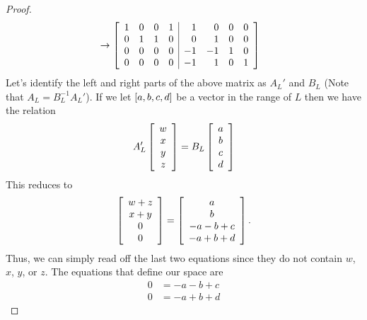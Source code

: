 \documentclass{tutorial}
\begin{document}
\begin{proof}
\begin{align*}
  & \rightarrow \left[ \begin{array}{rrrr|rrrr}
     1 &  0 &  0 &  1 & 1 & 0 & 0 & 0 \\
     0 &  1 &  1 &  0 & 0 & 1 & 0 & 0 \\
     0 &  0 &  0 &  0 &-1 &-1 & 1 & 0 \\
     0 &  0 &  0 &  0 &-1 & 1 & 0 & 1 \\
  \end{array} \right]
\end{align*}
Let's identify the left and right parts of the above matrix as $A_L'$ and $B_L$ (Note that $A_L = B_L^{-1}A_L'$). If we let $\left[ a, b, c, d \right]$ be a vector in the range of $L$ then we have the relation
\[
  A_L' \left[ \begin{array}{c} w \\ x \\ y \\ z \end{array} \right]
  = B_L \left[ \begin{array}{c} a \\ b \\ c \\ d \end{array} \right]
\]
This reduces to
\[
  \left[ \begin{array}{c}
    w+z \\
    x+y \\
    0 \\
    0
  \end{array} \right]
  = \left[ \begin{array}{c}
    a \\
    b \\
    -a-b+c \\
    -a+b+d
  \end{array} \right] .
\]
Thus, we can simply read off the last two equations since they do not contain $w$, $x$, $y$, or $z$. The equations that define our space are
\begin{align*}
  0 & = -a-b+c \\
  0 & = -a+b+d
\end{align*}
\end{proof}\else \newpage \fi
\end{document}
